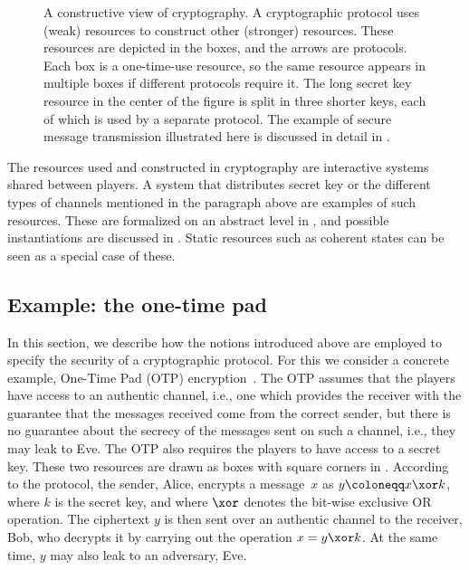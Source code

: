 \begin{figure*}[tbp]
\caption[Recursive construction of
resources]{\label{fig:construction}A constructive view of
  cryptography. A cryptographic protocol uses (weak) resources to
  construct other (stronger) resources. These resources are depicted
  in the boxes, and the arrows are protocols. Each box is a
  one-time-use resource, so the same resource appears in multiple
  boxes if different protocols require it. The long secret key
  resource in the center of the figure is split in three shorter keys,
  each of which is used by a separate protocol. The example of secure
  message transmission illustrated here is discussed in detail in
  .}
\end{figure*}

The resources used and constructed in cryptography are interactive
systems shared between players. A system that distributes secret key
or the different types of channels mentioned in the paragraph above
are examples of such resources. These are formalized on an abstract
level in , and possible instantiations are
discussed in . Static resources such as
coherent states \cite{BCP14,MZYM19} can be seen as a special case of
these.




\subsection{Example: the one-time pad}
\label{sec:ac.otp}

In this section, we describe how the notions introduced above are
employed to specify the security of a cryptographic protocol. For this
we consider a concrete example, One-Time Pad (OTP)
encryption~\cite{Vernam26}. The OTP assumes that the players have access
to an authentic channel, i.e., one which provides the receiver with
the guarantee that the messages received come from the correct sender,
but there is no guarantee about the secrecy of the messages sent on
such a channel, i.e., they may leak to Eve. The OTP also requires the
players to have access to a secret key. These two resources are drawn
as boxes with square corners in . According to
the protocol, the sender, Alice, encrypts a message~$x$ as
$y \coloneqq x \xor k$, where $k$ is the secret key, and where $\xor$
denotes the bit-wise exclusive OR operation. The ciphertext $y$ is
then sent over an authentic channel to the receiver, Bob, who decrypts
it by carrying out the operation $x = y \xor k$. At the same time, $y$
may also leak to an adversary, Eve.


